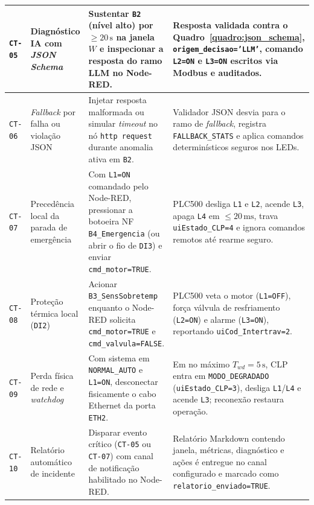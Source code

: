 \begin{quadro}[htb]
\begin{tabularx}{\textwidth}{|p{1.05cm}|p{2.45cm}|L|L|}
    \hline
    \texttt{CT-05} & Diagnóstico IA com \textit{JSON Schema} & Sustentar \texttt{B2} (nível alto) por $\ge 20\,\text{s}$ na janela $W$ e inspecionar a resposta do ramo LLM no Node-RED. & Resposta validada contra o Quadro~\ref{quadro:json_schema}, \texttt{origem\_decisao='LLM'}, comando \texttt{L2=ON} e \texttt{L3=ON} escritos via Modbus e auditados. \\
    \hline
    \texttt{CT-06} & \textit{Fallback} por falha ou violação JSON & Injetar resposta malformada ou simular \textit{timeout} no nó \texttt{http request} durante anomalia ativa em \texttt{B2}. & Validador JSON desvia para o ramo de \textit{fallback}, registra \texttt{FALLBACK\_STATS} e aplica comandos determinísticos seguros nos LEDs. \\
    \hline
    \texttt{CT-07} & Precedência local da parada de emergência & Com \texttt{L1=ON} comandado pelo Node-RED, pressionar a botoeira NF \texttt{B4\_Emergencia} (ou abrir o fio de \texttt{DI3}) e enviar \texttt{cmd\_motor=TRUE}. & PLC500 desliga \texttt{L1} e \texttt{L2}, acende \texttt{L3}, apaga \texttt{L4} em $\le 20\,\text{ms}$, trava \texttt{uiEstado\_CLP=4} e ignora comandos remotos até rearme seguro. \\
    \hline
    \texttt{CT-08} & Proteção térmica local (\texttt{DI2}) & Acionar \texttt{B3\_SensSobretemp} enquanto o Node-RED solicita \texttt{cmd\_motor=TRUE} e \texttt{cmd\_valvula=FALSE}. & PLC500 veta o motor (\texttt{L1=OFF}), força válvula de resfriamento (\texttt{L2=ON}) e alarme (\texttt{L3=ON}), reportando \texttt{uiCod\_Intertrav=2}. \\
    \hline
    \texttt{CT-09} & Perda física de rede e \textit{watchdog} & Com sistema em \texttt{NORMAL\_AUTO} e \texttt{L1=ON}, desconectar fisicamente o cabo Ethernet da porta \texttt{ETH2}. & Em no máximo $T_{wd} = 5\,\text{s}$, CLP entra em \texttt{MODO\_DEGRADADO} (\texttt{uiEstado\_CLP=3}), desliga \texttt{L1}/\texttt{L4} e acende \texttt{L3}; reconexão restaura operação. \\
    \hline
    \texttt{CT-10} & Relatório automático de incidente & Disparar evento crítico (\texttt{CT-05} ou \texttt{CT-07}) com canal de notificação habilitado no Node-RED. & Relatório Markdown contendo janela, métricas, diagnóstico e ações é entregue no canal configurado e marcado como \texttt{relatorio\_enviado=TRUE}. \\
    \hline
  \end{tabularx}
\end{quadro}

